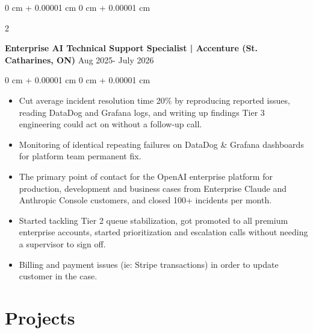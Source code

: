 \documentclass[10pt, letterpaper]{article}
\newenvironment{highlights}{
    \begin{itemize}[
        topsep=0.10 cm,
        parsep=0.10 cm,
        partopsep=0pt,
        itemsep=0pt,
        leftmargin=0 cm + 10pt
    ]
}{
    \end{itemize}
} %
\newenvironment{onecolentry}{
    \begin{adjustwidth}{
        0 cm + 0.00001 cm
    }{
        0 cm + 0.00001 cm
    }
}{
    \end{adjustwidth}
} %
\newenvironment{twocolentry}[2][]{
    \onecolentry
    \def\secondColumn{#2}
    \setcolumnwidth{\fill, 4.5 cm}
    \begin{paracol}{2}
}{
    \switchcolumn \raggedleft \secondColumn
    \end{paracol}
    \endonecolentry
} %
\begin{document}
        \begin{twocolentry}{
            {Aug 2025- July 2026}
        }
            \textbf{Enterprise AI Technical Support Specialist | Accenture (St. Catharines, ON)}\end{twocolentry}
        \vspace{0.10 cm}
        \begin{onecolentry}
            \begin{highlights}
                \item Cut average incident resolution time 20\% by reproducing reported issues, reading DataDog and Grafana logs, and writing up findings Tier 3 engineering could act on without a follow-up call.
                \item Monitoring of identical repeating failures on DataDog \& Grafana dashboards for platform team permanent fix.
                \item The primary point of contact for the OpenAI enterprise platform for production, development and business cases from Enterprise Claude and Anthropic Console customers, and closed 100+ incidents per month.
                \item Started tackling Tier 2 queue stabilization, got promoted to all premium enterprise accounts, started prioritization and escalation calls without needing a supervisor to sign off.
                \item Billing and payment issues (ie: Stripe transactions) in order to update customer in the case.
            \end{highlights}
        \end{onecolentry}

    \section{Projects}
\end{document}

